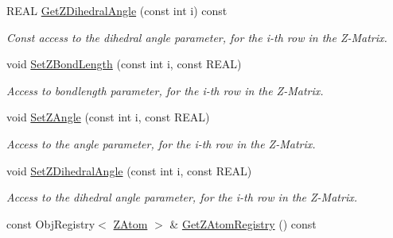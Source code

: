 \begin{DoxyCompactItemize}
\mbox{\label{class_obj_cryst_1_1_z_scatterer_ad3660563f646c8dc1ffd939f507223ef}} 
R\+E\+AL \mbox{\hyperlink{class_obj_cryst_1_1_z_scatterer_ad3660563f646c8dc1ffd939f507223ef}{Get\+Z\+Dihedral\+Angle}} (const int i) const
\begin{DoxyCompactList}\small\item\em Const access to the dihedral angle parameter, for the i-\/th row in the Z-\/\+Matrix. \end{DoxyCompactList}\item 
\mbox{\label{class_obj_cryst_1_1_z_scatterer_acbad23f36916911878e3179fb70c62ba}} 
void \mbox{\hyperlink{class_obj_cryst_1_1_z_scatterer_acbad23f36916911878e3179fb70c62ba}{Set\+Z\+Bond\+Length}} (const int i, const R\+E\+AL)
\begin{DoxyCompactList}\small\item\em Access to bondlength parameter, for the i-\/th row in the Z-\/\+Matrix. \end{DoxyCompactList}\item 
\mbox{\label{class_obj_cryst_1_1_z_scatterer_a20e056b613cfcb83be567c672df7fca6}} 
void \mbox{\hyperlink{class_obj_cryst_1_1_z_scatterer_a20e056b613cfcb83be567c672df7fca6}{Set\+Z\+Angle}} (const int i, const R\+E\+AL)
\begin{DoxyCompactList}\small\item\em Access to the angle parameter, for the i-\/th row in the Z-\/\+Matrix. \end{DoxyCompactList}\item 
\mbox{\label{class_obj_cryst_1_1_z_scatterer_a75a9bc717dd7c1fae40ad53176017bd6}} 
void \mbox{\hyperlink{class_obj_cryst_1_1_z_scatterer_a75a9bc717dd7c1fae40ad53176017bd6}{Set\+Z\+Dihedral\+Angle}} (const int i, const R\+E\+AL)
\begin{DoxyCompactList}\small\item\em Access to the dihedral angle parameter, for the i-\/th row in the Z-\/\+Matrix. \end{DoxyCompactList}\item 
\mbox{\label{class_obj_cryst_1_1_z_scatterer_a32f2d6afffcc233ee314f365053fcc43}} 
const Obj\+Registry$<$ \mbox{\hyperlink{class_obj_cryst_1_1_z_atom}{Z\+Atom}} $>$ \& \mbox{\hyperlink{class_obj_cryst_1_1_z_scatterer_a32f2d6afffcc233ee314f365053fcc43}{Get\+Z\+Atom\+Registry}} () const

\end{DoxyCompactItemize}
